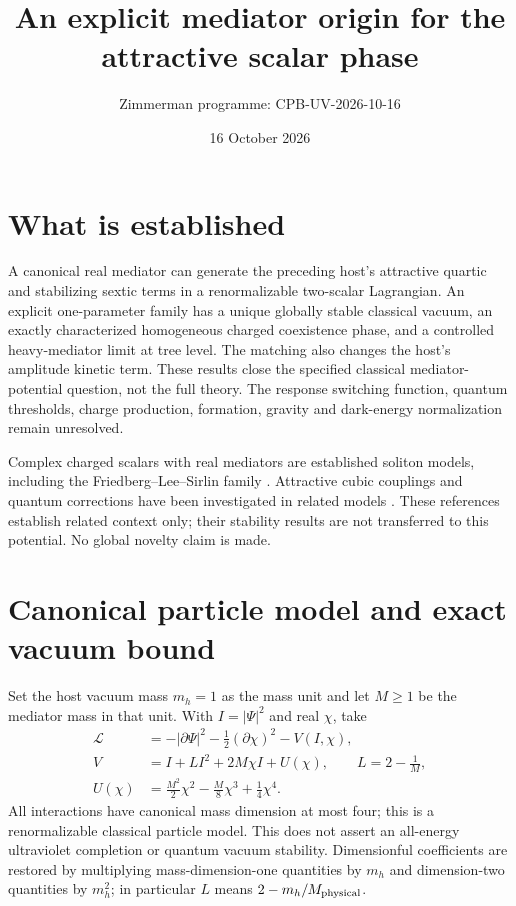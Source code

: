 \documentclass[11pt]{article}
\title{An explicit mediator origin for the attractive scalar phase}
\author{Zimmerman programme: CPB-UV-2026-10-16}
\date{16 October 2026}
\begin{document}
\maketitle
\section{What is established}
A canonical real mediator can generate the preceding host's attractive
quartic and stabilizing sextic terms in a renormalizable two-scalar
Lagrangian. An explicit one-parameter family has a unique globally stable
classical vacuum, an exactly characterized homogeneous charged coexistence
phase, and a controlled heavy-mediator limit at tree level. The matching
also changes the host's amplitude kinetic term. These results close the
specified classical mediator-potential question, not the full theory.
The response switching function, quantum thresholds, charge production,
formation, gravity and dark-energy normalization remain unresolved.

Complex charged scalars with real mediators are established soliton models,
including the Friedberg--Lee--Sirlin family \cite{uv:FLS}. Attractive cubic
couplings and quantum corrections have been investigated in related
models \cite{uv:attractive,uv:quantum}. These references establish related
context only; their stability results are not transferred to this potential.
No global novelty claim is made.

\section{Canonical particle model and exact vacuum bound}
Set the host vacuum mass $m_h=1$ as the mass unit and let $M\ge1$ be
the mediator mass in that unit. With $I=|\Psi|^2$ and real $\chi$, take
\begin{align}
 \mathcal L&=-|\partial\Psi|^2-\tfrac12(\partial\chi)^2-V(I,\chi),\\
 V&=I+L I^2+2M\chi I+U(\chi),\qquad L=2-\frac1M,\\
 U(\chi)&=\frac{M^2}{2}\chi^2-\frac M8\chi^3+\frac14\chi^4.
 \label{uv:potential}
\end{align}
All interactions have canonical mass dimension at most four; this is a
renormalizable classical particle model. This does not assert an
all-energy ultraviolet completion or quantum vacuum stability. Dimensionful
coefficients are restored by multiplying mass-dimension-one quantities by
$m_h$ and dimension-two quantities by $m_h^2$; in particular $L$ means
$2-m_h/M_{\rm physical}$.
\end{document}
